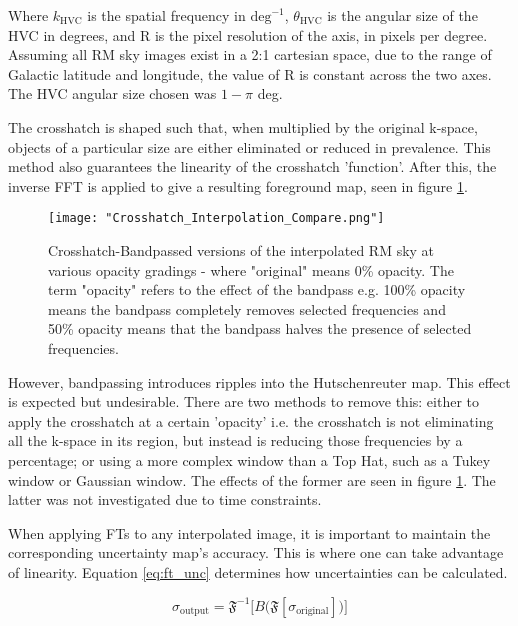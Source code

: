 Where $k_{\mathrm{HVC}}$ is the spatial frequency in $\mathrm{deg}^{-1}$, $\theta_{\mathrm{HVC}}$ is the angular size of the HVC in degrees, and R is the pixel resolution of the axis, in pixels per degree. Assuming all RM sky images exist in a 2:1 cartesian space, due to the range of Galactic latitude and longitude, the value of R is constant across the two axes. The HVC angular size chosen was $1 - \pi$ deg.


The crosshatch is shaped such that, when multiplied by the original k-space, objects of a particular size are either eliminated or reduced in prevalence. This method also guarantees the linearity of the crosshatch 'function'. After this, the inverse FFT is applied to give a resulting foreground map, seen in figure \ref{fig:ripples}.

\begin{figure}
    \texttt{[image: "Crosshatch\_Interpolation\_Compare.png"]}
    \centering
    \caption{Crosshatch-Bandpassed versions of the interpolated RM sky at various opacity gradings - where "original" means 0\% opacity. The term "opacity" refers to the effect of the bandpass e.g. 100\% opacity means the bandpass completely removes selected frequencies and 50\% opacity means that the bandpass halves the presence of selected frequencies.}
    \label{fig:ripples}
\end{figure}


However, bandpassing introduces ripples into the Hutschenreuter map. This effect is expected but undesirable. There are two methods to remove this: either to apply the crosshatch at a certain 'opacity' i.e. the crosshatch is not eliminating all the k-space in its region, but instead is reducing those frequencies by a percentage; or using a more complex window than a Top Hat, such as a Tukey window or Gaussian window. The effects of the former are seen in figure \ref{fig:ripples}. The latter was not investigated due to time constraints.


When applying FTs to any interpolated image, it is important to maintain the corresponding uncertainty map's accuracy. This is where one can take advantage of linearity. Equation \ref{eq:ft_unc} determines how uncertainties can be calculated.


\begin{equation}
    \sigma_{\mathrm{output}} = \mathbf{\mathfrak{F}}^{-1} \biggl[ B \bigl( \mathbf{\mathfrak{F}} \left[ \sigma_{\mathrm{original}} \right] \bigr) \biggr]
    \label{eq:ft_unc}
\end{equation}


